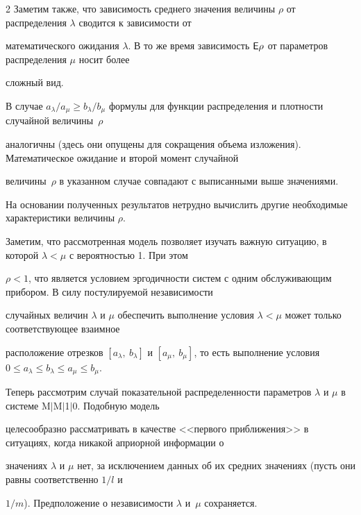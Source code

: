 \begin{multicols}{2}
Заметим также, что зависимость среднего значения величины $\rho$ от распределения $\lambda$ сводится к зависимости от


математического ожидания $\lambda$. В то же время зависимость ${\sf E}\rho$ от параметров распределения $\mu$ носит более


сложный вид.





В случае $a_\lambda/a_\mu\ge b_\lambda/b_\mu$ формулы для функции распределения и плотности случайной величины~$\rho$


аналогичны (здесь они опущены для сокращения объема изложения). Математическое ожидание и второй момент случайной


величины~$\rho$ в указанном случае совпадают с выписанными выше зна\-че\-ниями.





На основании полученных результатов нетрудно вычислить другие необходимые характеристики величины $\rho$.





Заметим, что рассмотренная модель позволяет изучать важную ситуацию, в которой $\lambda<\mu$ с вероятностью 1. При этом


$\rho<1$, что является условием эргодичности систем с одним обслуживающим прибором. В силу постулируемой независимости


случайных величин $\lambda$ и $\mu$ обеспечить выполнение условия $\lambda<\mu$ может только соответствующее взаимное


расположение отрезков $[a_\lambda,\ b_\lambda]$ и $[a_\mu,\ b_\mu]$, то есть выполнение условия $0\le a_\lambda\le


b_\lambda\le a_\mu\le b_\mu$.





Теперь рассмотрим случай показательной распределенности параметров $\lambda$ и $\mu$ в системе M$\vert$M$\vert$1$\vert$0. Подобную модель


целесообразно рассматривать в качестве <<первого приближения>> в ситуациях, когда никакой априорной информации о


значениях $\lambda$ и $\mu$ нет, за исключением данных об их средних значениях (пусть они равны соответственно $1/l$ и


$1/m$). Предположение о независимости $\lambda$ и~$\mu$ сохраняется.






\end{multicols}
